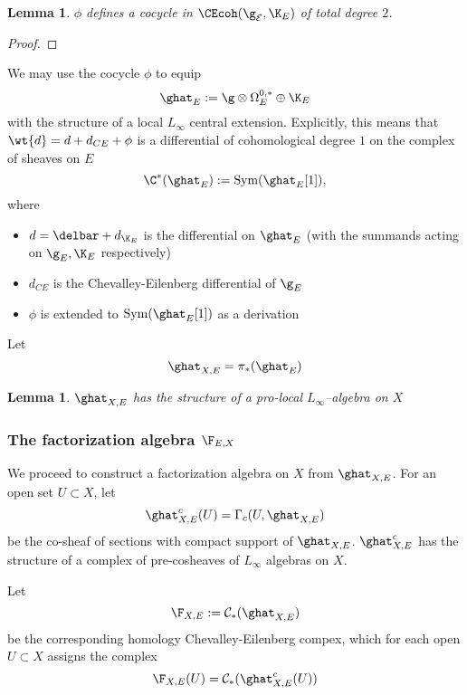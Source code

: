 \documentclass[12pt]{amsart}
\newtheorem{lemma}[theorem]{Lemma}
\theoremstyle{definition}
\theoremstyle{remark}
\newcommand{\on}{\operatorname}
\newcommand{\E}{{\mathcal E}}
\begin{document}
\begin{lemma}
$\phi$ defines a cocycle in $\CEcoh(\g_{\E}, \K_{E}) $ of total degree $2$.
\end{lemma}
\begin{proof}

\end{proof}

We may use the cocycle $\phi$ to equip 
\begin{equation}
\ghat_{E} := \g \otimes \Omega^{0,*}_E \oplus \K_{E}
\end{equation}
with the structure of a local $L_{\infty}$ central extension. Explicitly, this means that $\wt{d} = d + d_{CE} + \phi$ is a differential of cohomological degree $1$ on the complex of sheaves on $E$
\[
\C^{*}(\ghat_E) := \on{Sym}(\ghat_E[1]),
\]
where 
\begin{itemize}
\item $d = \delbar + d_{\K_E}$ is the differential on $\ghat_E$ (with the summands acting on $\g_E, \K_E$ respectively)
\item $d_{CE}$ is the Chevalley-Eilenberg differential of $\g_E$
\item $\phi$ is extended to $\on{Sym}(\ghat_E[1])$ as a derivation
\end{itemize}

Let 
\begin{equation}
\ghat_{X,E} = \pi_*(\ghat_E)
\end{equation}


\begin{lemma}
$\ghat_{X,E}$ has the structure of a pro-local $L_{\infty}$--algebra on $X$
\end{lemma}

\subsubsection{The factorization algebra $\F_{E,X}$}

We proceed to construct a factorization algebra on $X$ from $\ghat_{X,E}$. For an open set $U \subset X$, let
\begin{equation}
\ghat^c_{X,E}(U) = \Gamma_c (U, \ghat_{X,E})
\end{equation}
be the co-sheaf of sections with compact support of $\ghat_{X,E}$. $\ghat^c_{X,E}$ has the structure of a complex of pre-cosheaves of $L_{\infty}$ algebras on $X$. 

Let
\begin{equation}
\F_{X,E} := \mathcal{C}_{*} ( \ghat_{X,E} )
\end{equation}
be the corresponding homology Chevalley-Eilenberg compex, which for each open $U \subset X$ assigns the complex
\[
\F_{X,E}(U) = \mathcal{C}_{*} (\ghat^c_{X,E}(U))
\]
\end{document}
